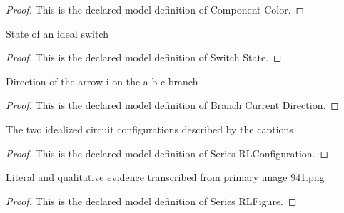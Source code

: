\begin{proof}
  This is the declared model definition of Component Color.
\end{proof}
\begin{definition}
  \label{def:physics:phyx-mini-0941:phyxminiproblems-problemphyxmini0941-switchstate}
  State of an ideal switch
\end{definition}
\begin{proof}
  This is the declared model definition of Switch State.
\end{proof}
\begin{definition}
  \label{def:physics:phyx-mini-0941:phyxminiproblems-problemphyxmini0941-branchcurrentdirection}
  Direction of the arrow i on the a-b-c branch
\end{definition}
\begin{proof}
  This is the declared model definition of Branch Current Direction.
\end{proof}
\begin{definition}
  \label{def:physics:phyx-mini-0941:phyxminiproblems-problemphyxmini0941-seriesrlconfiguration}
  The two idealized circuit configurations described by the captions
\end{definition}
\begin{proof}
  This is the declared model definition of Series RLConfiguration.
\end{proof}
\begin{definition}
  \label{def:physics:phyx-mini-0941:phyxminiproblems-problemphyxmini0941-seriesrlfigure}
  Literal and qualitative evidence transcribed from primary image 941.png
\end{definition}
\begin{proof}
  This is the declared model definition of Series RLFigure.
\end{proof}
